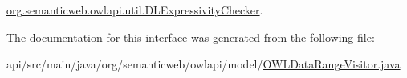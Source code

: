 \hyperlink{classorg_1_1semanticweb_1_1owlapi_1_1util_1_1_d_l_expressivity_checker_a55be540c671be015d8bbdb1d2c4a9834}{org.\-semanticweb.\-owlapi.\-util.\-D\-L\-Expressivity\-Checker}.



The documentation for this interface was generated from the following file\-:\begin{DoxyCompactItemize}
\item 
api/src/main/java/org/semanticweb/owlapi/model/\hyperlink{_o_w_l_data_range_visitor_8java}{O\-W\-L\-Data\-Range\-Visitor.\-java}\end{DoxyCompactItemize}
